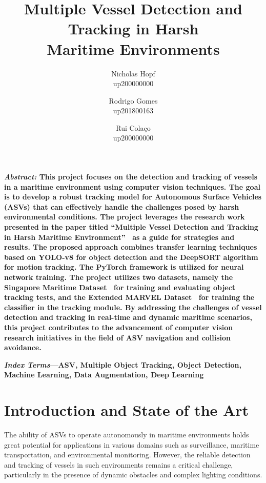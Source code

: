 \documentclass[a4paper,12pt]{article}
\title{Multiple Vessel Detection and Tracking in Harsh\\Maritime Environments}
\author{
    Nicholas Hopf\\
    up200000000
    \and
    Rodrigo Gomes\\
    up201800163
    \and
    Rui Colaço\\
    up200000000
}
\date{\vspace{-3ex}}
\begin{document}
\maketitle


\vspace{10pt}

\begin{multicols}{2}

\textbf{{\textit{Abstract:}} This project focuses on the detection and tracking of vessels in a maritime environment using computer vision techniques.
    The goal is to develop a robust tracking model for Autonomous Surface Vehicles (ASVs) that can effectively handle the challenges posed by harsh environmental conditions.
    The project leverages the research work presented in the paper titled ``Multiple Vessel Detection and Tracking in Harsh Maritime Environment''~\cite{MVDTHME} as a guide for strategies and results.
    The proposed approach combines transfer learning techniques based on YOLO-v8 for object detection and the DeepSORT algorithm for motion tracking.
    The PyTorch framework is utilized for neural network training.
    The project utilizes two datasets, namely the Singapore Maritime Dataset~\cite{SINGAPORE} for training and evaluating object tracking tests, and the Extended MARVEL Dataset~\cite{MARVEL} for training the classifier in the tracking module.
    By addressing the challenges of vessel detection and tracking in real-time and dynamic maritime scenarios, this project contributes to the advancement of computer vision research initiatives in the field of ASV navigation and collision avoidance.}
\label{tab:abstract}

\textbf{{\textit{Index Terms}}—ASV, Multiple Object Tracking, Object Detection, Machine Learning, Data Augmentation, Deep Learning}
\label{tab:index}



\section{Introduction and State of the Art}\label{sec:introduction-and-state-of-the-art}
The ability of ASVs to operate autonomously in maritime environments holds great potential for applications in various domains such as surveillance, maritime transportation, and environmental monitoring.
However, the reliable detection and tracking of vessels in such environments remains a critical challenge, particularly in the presence of dynamic obstacles and complex lighting conditions.


\end{multicols}
\end{document}
